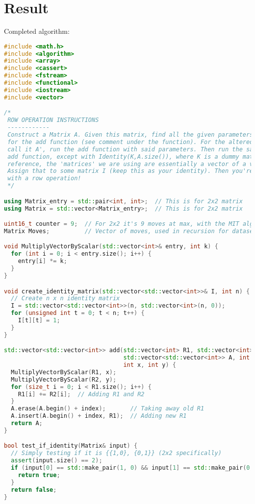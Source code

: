 \documentclass{article}
\begin{document}
\section*{Result}
Completed algorithm:
\begin{lstlisting}[language=C++]
#include <math.h>
#include <algorithm>
#include <array>
#include <cassert>
#include <fstream>
#include <functional>
#include <iostream>
#include <vector>

/*
 ROW OPERATION INSTRUCTIONS
 ------------
 Construct a Matrix A. Given this matrix, find all the given parameters needed
 for the add function (see comment under the function). For the altered matrix,
 call it A', run the add function with said parameters. Then run the same
 add function, except with Identity(K,A.size()), where K is a dummy matrix. (For
 reference, the 'matrices' we are using are essentially a vector of a vector)
 Assign that to some matrix I (keep this as your identity). Then you're done
 with a row operation!
 */

using Matrix_entry = std::pair<int, int>;  // This is for 2x2 matrix
using Matrix = std::vector<Matrix_entry>;  // This is for 2x2 matrix

uint16_t counter = 9;  // For 2x2 it's 9 moves at max, with the MIT algorithm
Matrix Moves;          // Vector of moves, used in recursion for dataset

void MultiplyVectorByScalar(std::vector<int>& entry, int k) {
  for (int i = 0; i < entry.size(); i++) {
    entry[i] *= k;
  }
}

void create_identity_matrix(std::vector<std::vector<int>>& I, int n) {
  // Create n x n identity matrix
  I = std::vector<std::vector<int>>(n, std::vector<int>(n, 0));
  for (unsigned int t = 0; t < n; t++) {
    I[t][t] = 1;
  }
}

std::vector<std::vector<int>> add(std::vector<int> R1, std::vector<int> R2,
                                  std::vector<std::vector<int>> A, int index,
                                  int x, int y) {
  MultiplyVectorByScalar(R1, x);
  MultiplyVectorByScalar(R2, y);
  for (size_t i = 0; i < R1.size(); i++) {
    R1[i] += R2[i];  // Adding R1 and R2
  }
  A.erase(A.begin() + index);       // Taking away old R1
  A.insert(A.begin() + index, R1);  // Adding new R1
  return A;
}

bool test_if_identity(Matrix& input) {
  // Simply testing if it is {{1,0}, {0,1}} (2x2 specifically)
  assert(input.size() == 2);
  if (input[0] == std::make_pair(1, 0) && input[1] == std::make_pair(0, 1)) {
    return true;
  }
  return false;
}


\end{lstlisting}
\end{document}
